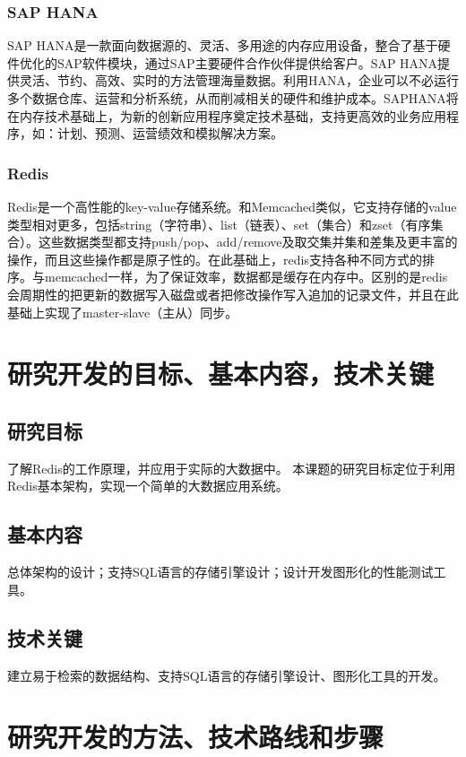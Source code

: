 \documentclass[proposal]{zjutreport}
\begin{document}
\subsection{SAP HANA}
SAP HANA是一款面向数据源的、灵活、多用途的内存应用设备，整合了基于硬件优化的SAP软件模块，通过SAP主要硬件合作伙伴提供给客户。SAP HANA提供灵活、节约、高效、实时的方法管理海量数据。利用HANA，企业可以不必运行多个数据仓库、运营和分析系统，从而削减相关的硬件和维护成本。SAPHANA将在内存技术基础上，为新的创新应用程序奠定技术基础，支持更高效的业务应用程序，如：计划、预测、运营绩效和模拟解决方案。

\subsection{Redis}
Redis是一个高性能的key-value存储系统。和Memcached类似，它支持存储的value类型相对更多，包括string（字符串）、list（链表）、set（集合）和zset（有序集合）。这些数据类型都支持push/pop、add/remove及取交集并集和差集及更丰富的操作，而且这些操作都是原子性的。在此基础上，redis支持各种不同方式的排序。与memcached一样，为了保证效率，数据都是缓存在内存中。区别的是redis会周期性的把更新的数据写入磁盘或者把修改操作写入追加的记录文件，并且在此基础上实现了master-slave（主从）同步。

\chapter{研究开发的目标、基本内容，技术关键}
\section{研究目标}
了解Redis的工作原理，并应用于实际的大数据中。
本课题的研究目标定位于利用Redis基本架构，实现一个简单的大数据应用系统。

\section{基本内容}
总体架构的设计；支持SQL语言的存储引擎设计；设计开发图形化的性能测试工具。

\section{技术关键}
建立易于检索的数据结构、支持SQL语言的存储引擎设计、图形化工具的开发。

\chapter{研究开发的方法、技术路线和步骤}
\end{document}
